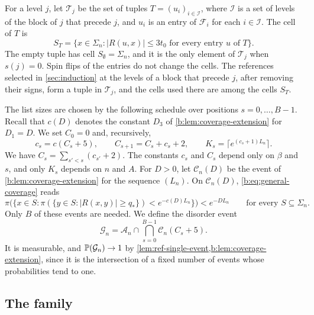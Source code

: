 For a level $j$, let $\mathcal T_j$ be the set of tuples $T=(u_i)_{i\in\mathcal I}$,
where $\mathcal I$ is a set of levels of the block of $j$ that precede $j$, and $u_i$
is an entry of $\mathcal F_i$ for each $i\in\mathcal I$. The cell of $T$ is
\begin{equation}\label{eq:ref-cell}
 S_T=\bigl\{x\in\Sigma_n:|R(u,x)|\le3t_0\text{ for every entry }u
   \text{ of }T\bigr\}.
\end{equation}
The empty tuple has cell $S_\emptyset=\Sigma_n$, and it is the only element
of $\mathcal T_j$ when $s(j)=0$. Spin flips of the entries do not change the
cells. The references selected in \cref{sec:induction} at the levels of a
block that precede $j$, after removing their signs, form a tuple in $\mathcal T_j$, and the cells used
there are among the cells $S_T$.

The list sizes are chosen by the following schedule over positions
$s=0,\ldots,B-1$. Recall that $c(D)$ denotes the constant $D_3$ of
\cref{b:lem:coverage-extension} for $D_1=D$. We set $C_0=0$ and, recursively,
\begin{equation}\label{eq:ref-schedule}
 c_s=c(C_s+5),\qquad C_{s+1}=C_s+c_s+2,\qquad
 K_s=\bigl\lceil e^{(c_s+1)L_n}\bigr\rceil .
\end{equation}
We have $C_s=\sum_{s'<s}(c_{s'}+2)$. The constants $c_s$ and $C_s$ depend only
on $\beta$ and $s$, and only $K_s$ depends on $n$ and $A$. For $D>0$, let
$\mathcal C_n(D)$ be the event of \cref{b:lem:coverage-extension} for the
sequence $(L_n)$. On $\mathcal C_n(D)$, \eqref{b:eq:general-coverage} reads
\begin{equation}\label{b:dyn:coverage}
 \pi\bigl(\bigl\{x\in S:\pi(\{y\in S:|R(x,y)|\ge q_*\})<e^{-c(D)L_n}\bigr\}
   \bigr)<e^{-DL_n}\qquad\text{for every }S\subseteq\Sigma_n .
\end{equation}
Only $B$ of these events are needed. We define the disorder event
\begin{equation}\label{eq:ref-good-event}
 \mathcal G_n=\mathcal A_n\cap\bigcap_{s=0}^{B-1}\mathcal C_n(C_s+5).
\end{equation}
It is measurable, and $\mathbb P(\mathcal G_n)\to1$ by
\cref{lem:ref-single-event,b:lem:coverage-extension}, since it is the
intersection of a fixed number of events whose probabilities tend to one.

\subsection{The family}

